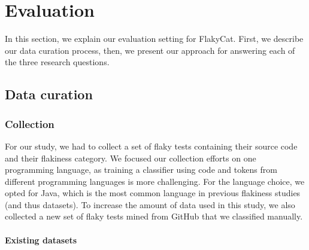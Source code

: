 \section{Evaluation}
\label{sec:flakycat-evaluation}

In this section, we explain our evaluation setting for FlakyCat.
First, we describe our data curation process, then, we present our approach for answering each of the three research questions. 



\subsection{Data curation}
\label{dataset}

\subsubsection{Collection}
For our study, we had to collect a set of flaky tests containing their source code and their flakiness category.
We focused our collection efforts on one programming language, as training a classifier using code and tokens from different programming languages is more challenging. 
For the language choice, we opted for Java, which is the most common language in previous flakiness studies (and thus datasets). 
To increase the amount of data used in this study, we also collected a new set of flaky tests mined from GitHub that we classified manually.


\paragraph{Existing datasets} 

